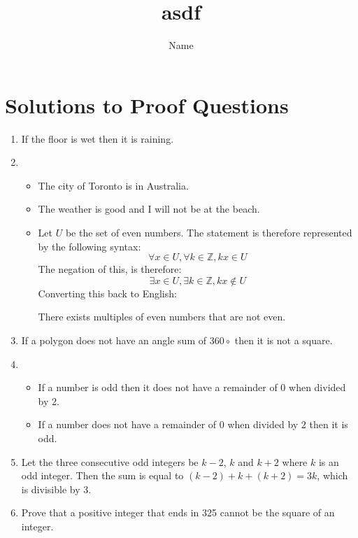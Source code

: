 \documentclass[11pt, a4paper, oneside]{exam}
\title{asdf}
\author{Name
}
\date{}
\theoremstyle{definition}\newtheorem{define}{Definition}[section]
\theoremstyle{remark}\newtheorem{remark}{Remark}
\theoremstyle{definition}\newtheorem{example}{Example}[subsection]
\theoremstyle{definition}\newtheorem{notation}{Notation}[section]
\theoremstyle{definition}\newtheorem{theorem}{Theorem}[section]
\theoremstyle{definition}\newtheorem{corollary}{Corollary}[section]
\begin{document}
\section{Solutions to Proof Questions}
\begin{enumerate}
\item 

If the floor is wet then it is raining.

\item 

\begin{itemize}
  \item The city of Toronto is in Australia.
  \item The weather is good and I will not be at the beach.
  \item Let $U$ be the set of even numbers. The statement is therefore represented by the following syntax:
    \[ \forall x \in U, \forall k \in \mathbb{Z}, kx \in U \]
    The negation of this, is therefore:
    \[ \exists x \in U, \exists k \in \mathbb{Z}, kx \not \in U \]
    Converting this back to English:

    There exists multiples of even numbers that are not even.
\end{itemize}

\item 

If a polygon does not have an angle sum of $360\circ$ then it is not a square.

\item

\begin{itemize}
\item If a number is odd then it does not have a remainder of 0 when divided by 2.
\item If a number does not have a remainder of 0 when divided by 2 then it is odd.
\end{itemize}

\item Let the three consecutive odd integers be $k-2$, $k$ and $k+2$ where $k$ is an odd integer. Then the sum is equal to $(k-2) + k + (k+2) = 3k$, which is divisible by 3.

\item Prove that a positive integer that ends in 325 cannot be the square of an integer.


\end{enumerate}
\end{document}
